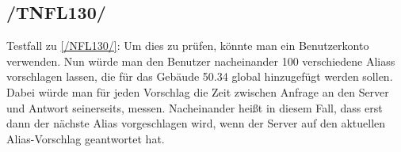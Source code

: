 \subsection*{/TNFL130/}
\label{/TNFL130/} Testfall zu \ref{/NFL130/}: Um dies zu prüfen, könnte man ein \Gls{Benutzer}konto verwenden. Nun würde man den \Gls{Benutzer} nacheinander 100 verschiedene \Glspl{Alias} vorschlagen lassen, die für das Gebäude 50.34 \gls{global} hinzugefügt werden sollen. Dabei würde man für jeden Vorschlag die Zeit zwischen Anfrage an den \Gls{Server} und Antwort seinerseits, messen. Nacheinander heißt in diesem Fall, dass erst dann der nächste \Gls{Alias} vorgeschlagen wird, wenn der \Gls{Server} auf den aktuellen \Gls{Alias-Vorschlag} geantwortet hat.